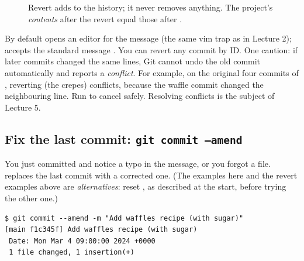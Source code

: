 \begin{figure}[H]
\centering
{}
\caption{Revert adds to the history; it never removes anything. The project's \emph{contents} after the revert equal those after .}
\label{fig:revert}
\end{figure}

By default  opens an editor for the message (the same vim trap as in Lecture 2);  accepts the standard message . You can revert any commit by ID. One caution: if later commits changed the same lines, Git cannot undo the old commit automatically and reports a \emph{conflict}. For example, on the original four commits of , reverting  (the crepes) conflicts, because the waffle commit changed the neighbouring line. Run  to cancel safely. Resolving conflicts is the subject of Lecture 5.

\subsection{Fix the last commit: \texttt{git commit --amend}}

You just committed and notice a typo in the message, or you forgot a file.  replaces the last commit with a corrected one. (The examples here and the revert examples above are \emph{alternatives}: reset , as described at the start, before trying the other one.)

\begin{lstlisting}
$ git commit --amend -m "Add waffles recipe (with sugar)"
[main f1c345f] Add waffles recipe (with sugar)
 Date: Mon Mar 4 09:00:00 2024 +0000
 1 file changed, 1 insertion(+)
\end{lstlisting}

